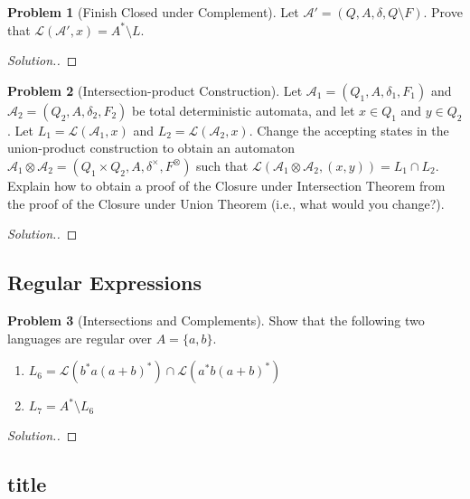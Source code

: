 \documentclass[11pt]{article}
\theoremstyle{theorem} %
\theoremstyle{definition} %
\newtheorem{problem}                    {{\color{BurntOrange}Problem}}
\theoremstyle{remark} %
\begin{document}
\begin{problem}
    [Finish Closed under Complement]
    Let \(\mathcal A' = (Q, A, \delta, Q\setminus F)\).
    Prove that \(\mathcal L(\mathcal A', x) = A^* \setminus L\).
\end{problem}

\begin{proof}[Solution.]
    
\end{proof}

\begin{problem}
    [Intersection-product Construction]
    Let \(\mathcal A_1 = (Q_1, A, \delta_1, F_1)\) and \(\mathcal A_2 = (Q_2, A, \delta_2, F_2)\) be total deterministic automata, and let \(x \in Q_1\) and \(y \in Q_2\).
    Let \(L_1 = \mathcal L(\mathcal A_1, x)\) and \(L_2 = \mathcal L(\mathcal A_2, x)\).
    Change the accepting states in the union-product construction to obtain an automaton \(\mathcal A_1 \otimes \mathcal A_2 = (Q_1 \times Q_2, A, \delta^\times, F^
    \otimes)\) such that \(\mathcal L(\mathcal A_1 \otimes \mathcal A_2, (x, y)) = L_1 \cap L_2\).
    Explain how to obtain a proof of the Closure under Intersection Theorem from the proof of the Closure under Union Theorem (i.e., what would you change?).
\end{problem}

\begin{proof}[Solution.]
    
\end{proof}

\subsection*{Regular Expressions}

\begin{problem}
    [Intersections and Complements]
    Show that the following two languages are regular over \(A = \{a, b\}\). 
    \begin{enumerate}
        \item \(L_6 = \mathcal L(b^*a(a + b)^*) \cap \mathcal L(a^*b(a + b)^*)\)
        \item \(L_7 = A^* \setminus L_6\)
    \end{enumerate}
\end{problem}

\begin{proof}[Solution.]
    
\end{proof}

\subsection*{title}
\end{document}

